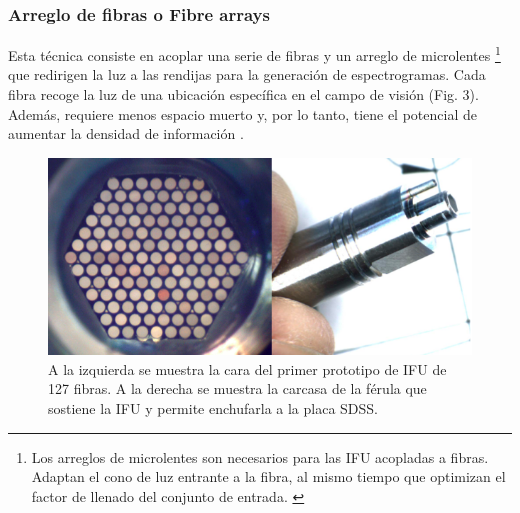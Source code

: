 \documentclass[10pt,twocolumn,a4paper]{opticajnl}
\begin{document}
\subsubsection*{Arreglo de fibras o Fibre arrays} 
Esta técnica consiste en acoplar una serie de fibras y un arreglo de microlentes \footnote{Los arreglos de microlentes son necesarios para las IFU acopladas a fibras. Adaptan el cono de luz entrante a la fibra, al mismo tiempo que optimizan el factor de llenado del conjunto de entrada. \cite{schmoll2006design}} que redirigen la luz a las rendijas para la generación de espectrogramas. Cada fibra recoge la luz de una ubicación específica en el campo de visión (Fig. 3). Además, requiere menos espacio muerto y, por lo tanto, tiene el potencial de aumentar la densidad de información \cite{allington2006basic}.
\begin{figure}
    \centering
    \includegraphics[width=0.8\linewidth]{fibrefeed.png}
    \caption{A la izquierda se muestra la cara del primer prototipo de IFU de 127 fibras. A la derecha se muestra la carcasa de la férula que sostiene la IFU y permite enchufarla a la placa SDSS. \cite{sdss_bundle_ferrule}}
    \label{fig:fibrefeed}
\end{figure}
\end{document}
